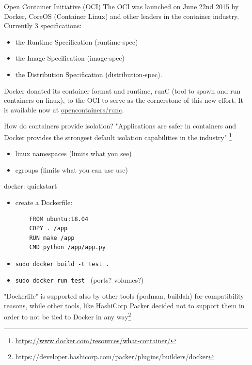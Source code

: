 \documentclass[english]{tumbeamer}
\begin{document}
\begin{frame}{Open Container Initiative (OCI)}
The OCI was launched on June 22nd 2015 by Docker, CoreOS (Container Linux) and other leaders in the container industry. Currently 3 specifications:
\vspace{3mm}
\begin{itemize}
    \item the Runtime Specification (runtime-spec)
    \item the Image Specification (image-spec)
    \item the Distribution Specification (distribution-spec).
\end{itemize}
\vspace{3mm}
Docker donated its container format and runtime, runC (tool to spawn and run containers on linux), to the OCI to serve as the cornerstone of this new effort. It is available now at \href{https://github.com/opencontainers/runc}{opencontainers/runc}.
\end{frame}

\begin{frame}{How do containers provide isolation?}
"Applications are safer in containers and Docker provides the strongest default isolation capabilities in the industry" \footnote{\href{https://www.docker.com/resources/what-container/}{https://www.docker.com/resources/what-container/}}
\vspace{15mm}
\begin{itemize}
    \item linux namespaces (limits what you see)
    \item cgroups (limits what you can use use)
\end{itemize}
\end{frame}

\begin{frame}[fragile]{docker: quickstart}
\begin{itemize}
    \item create a Dockerfile:
    \begin{verbatim}
    FROM ubuntu:18.04
    COPY . /app
    RUN make /app
    CMD python /app/app.py
    \end{verbatim}
    \item \texttt{sudo docker build -t test . }
    \item \texttt{sudo docker run test } (ports? volumes?)
\end{itemize}
\vspace{3mm}
"Dockerfile" is supported also by other tools (podman, buildah) for compatibility reasons, while other tools, like HashiCorp Packer decided not to support them in order to not be tied to Docker in any way\footnote{https://developer.hashicorp.com/packer/plugins/builders/docker}
\end{frame}
\end{document}
